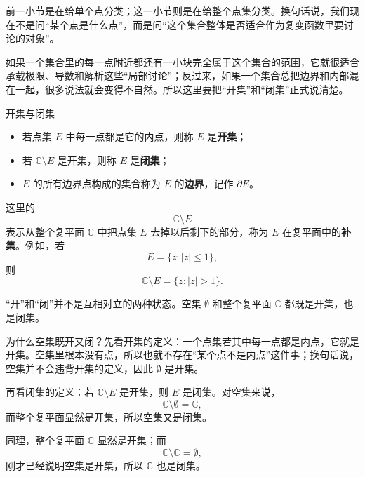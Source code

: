 前一小节是在给单个点分类；这一小节则是在给整个点集分类。换句话说，我们现在不是问``某个点是什么点''，而是问``这个集合整体是否适合作为复变函数里要讨论的对象''。

如果一个集合里的每一点附近都还有一小块完全属于这个集合的范围，它就很适合承载极限、导数和解析这些``局部讨论''；反过来，如果一个集合总把边界和内部混在一起，很多说法就会变得不自然。所以这里要把``开集''和``闭集''正式说清楚。

\begin{dingliyi}{开集与闭集}{}
\begin{itemize}
    \item 若点集 $E$ 中每一点都是它的内点，则称 $E$ 是\textbf{开集}；
    \item 若 $\mathbb{C}\setminus E$ 是开集，则称 $E$ 是\textbf{闭集}；
    \item $E$ 的所有边界点构成的集合称为 $E$ 的\textbf{边界}，记作 $\partial E$。
\end{itemize}
\end{dingliyi}

\begin{zhu}{}{}
这里的
\[
    \mathbb{C}\setminus E
\]
表示从整个复平面 $\mathbb{C}$ 中把点集 $E$ 去掉以后剩下的部分，称为 $E$ 在复平面中的\textbf{补集}。例如，若
\[
    E=\{z:|z|\le 1\},
\]
则
\[
    \mathbb{C}\setminus E=\{z:|z|>1\}.
\]
\end{zhu}

\begin{zhu}{}{}
``开''和``闭''并不是互相对立的两种状态。空集 $\emptyset$ 和整个复平面 $\mathbb{C}$ 都既是开集，也是闭集。

为什么空集既开又闭？先看开集的定义：一个点集若其中每一点都是内点，它就是开集。空集里根本没有点，所以也就不存在``某个点不是内点''这件事；换句话说，空集并不会违背开集的定义，因此 $\emptyset$ 是开集。

再看闭集的定义：若 $\mathbb{C}\setminus E$ 是开集，则 $E$ 是闭集。对空集来说，
\[
    \mathbb{C}\setminus \emptyset=\mathbb{C},
\]
而整个复平面显然是开集，所以空集又是闭集。

同理，整个复平面 $\mathbb{C}$ 显然是开集；而
\[
    \mathbb{C}\setminus \mathbb{C}=\emptyset,
\]
刚才已经说明空集是开集，所以 $\mathbb{C}$ 也是闭集。
\end{zhu}

